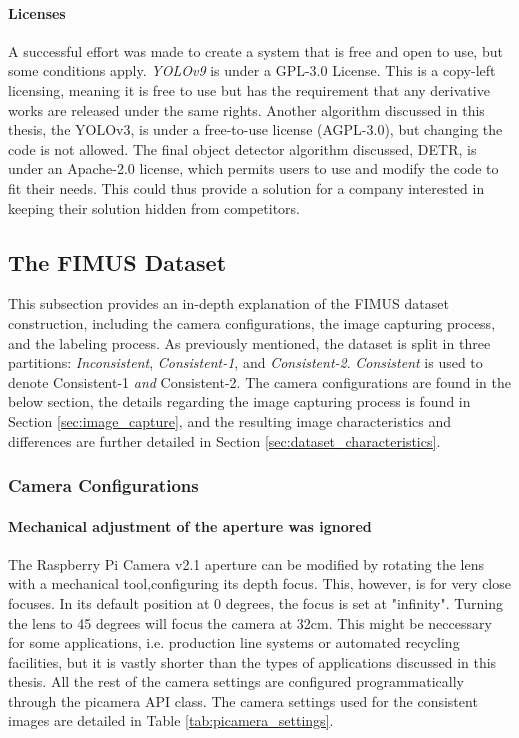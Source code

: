 \paragraph{Licenses}
A successful effort was made to create a system that is free and open to use, but some conditions apply. \textit{YOLOv9} is under a GPL-3.0 License. This is a copy-left licensing, meaning it is free to use but has the requirement that any derivative works are released under the same rights. Another algorithm discussed in this thesis, the YOLOv3, is under a free-to-use license (AGPL-3.0), but changing the code is not allowed. The final object detector algorithm discussed, DETR, is under an Apache-2.0 license, which permits users to use and modify the code to fit their needs. This could thus provide a solution for a company interested in keeping their solution hidden from competitors.

\subsection{The FIMUS Dataset}
\label{sec:dataset_construction}
This subsection provides an in-depth explanation of the FIMUS dataset construction, including the camera configurations, the image capturing process, and the labeling process. As previously mentioned, the dataset is split in three partitions: \textit{Inconsistent}, \textit{Consistent-1}, and \textit{Consistent-2}. \textit{Consistent} is used to denote Consistent-1 \textit{and} Consistent-2. The camera configurations are found in the below section, the details regarding the image capturing process is found in Section \ref{sec:image_capture}, and the resulting image characteristics and differences are further detailed in Section \ref{sec:dataset_characteristics}.

\subsubsection{Camera Configurations}
\paragraph{Mechanical adjustment of the aperture was ignored}
The Raspberry Pi Camera v2.1 aperture can be modified by rotating the lens with a mechanical tool,configuring its depth focus. This, however, is for very close focuses. In its default position at 0 degrees, the focus is set at "infinity". Turning the lens to 45 degrees will focus the camera at 32cm. This might be neccessary for some applications, i.e. production line systems or automated recycling facilities, but it is vastly shorter than the types of applications discussed in this thesis. All the rest of the camera settings are configured programmatically through the picamera API class. The camera settings used for the consistent images are detailed in Table \ref{tab:picamera_settings}.

